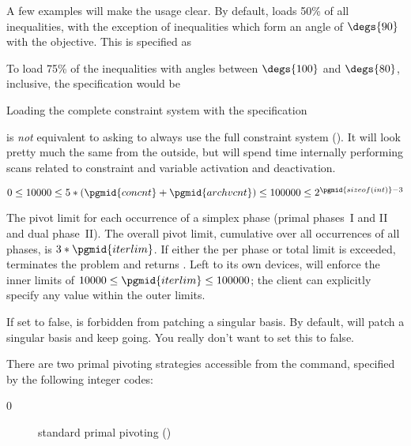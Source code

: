 \begin{codedoc}
  A few examples will make the usage clear.
  By default, \dylp loads 50\% of all inequalities, with the exception of
  inequalities which form an angle of $\degs{90}$ with the objective.
  This is specified as
  \begin{flushleft}
  \end{flushleft}
  To load 75\% of the inequalities with angles between $\degs{100}$ and
  $\degs{80}$, inclusive, the specification would be
  \begin{flushleft}
  \end{flushleft}
  Loading the complete constraint system with the specification
  \begin{flushleft}
  \end{flushleft}
  is \textit{not} equivalent to asking \dylp to always use the full constraint
  system (\cf {}).
  It will look pretty much the same from the outside, but \dylp will
  spend time internally
  performing scans related to constraint and variable activation and
  deactivation.


  \item{}
    \kw{;}

  $0 \leq 10000 \leq 5*(\pgmid{concnt}+\pgmid{archvcnt}) \le 100000
    \leq 2^{\pgmid{sizeof(int)}-3}$

  The pivot limit for each occurrence of a simplex phase
  (primal phases~I and II and dual phase~II).
  The overall pivot limit, cumulative over all occurrences of all phases,
  is $3*\pgmid{iterlim}$.
  If either the per phase or total limit is exceeded, \dylp terminates the
  problem and returns .
  Left to its own devices, \dylp will enforce the inner limits of
  $10000 \leq \pgmid{iterlim} \leq 100000$; the client can explicitly specify
  any value within the outer limits.

  \item{}
    \kw{;}

  If set to false, \dylp is forbidden from patching a singular basis.
  By default, \dylp will patch a singular basis and keep going.
  You really don't want to set this to false.

  \item{}
    \kw{;}

  There are two primal pivoting strategies accessible from the
   command, specified by the following integer codes:
  \begin{description}
    \item[0] standard primal pivoting
	     (\vid {})


\end{description}
\end{codedoc}
